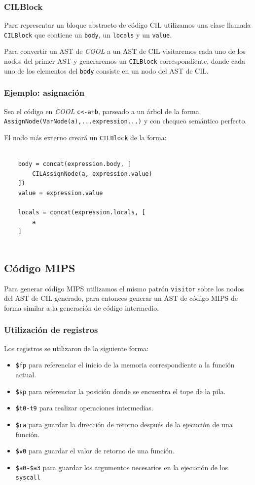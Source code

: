 \documentclass[a4paper,10pt,twocolumn]{article}
\begin{document}
\subsubsection{CILBlock}
Para representar un bloque abstracto de código CIL utilizamos una clase llamada \lstinline|CILBlock| que contiene un \lstinline|body|, un \lstinline|locals| y un \lstinline|value|. 

Para convertir un AST de \textit{COOL} a un AST de CIL visitaremos cada uno de los nodos del primer AST y generaremos un \lstinline|CILBlock| correspondiente, donde cada uno de los elementos del \lstinline|body| consiste en un nodo del AST de CIL.

\subsubsection{Ejemplo: asignación}
Sea el código en \textit{COOL} \lstinline|c<-a+b|, parseado a un árbol de la forma \lstinline|AssignNode(VarNode(a),...expression...)| y con chequeo semántico perfecto. 

El nodo más externo creará un \lstinline|CILBlock| de la forma:
	\begin{lstlisting}
	
	body = concat(expression.body, [ 
		CILAssignNode(a, expression.value)
	])
	value = expression.value
	
	locals = concat(expression.locals, [
		a
	]
	
	\end{lstlisting}

\subsection{Código MIPS}

Para generar código MIPS utilizamos el mismo patrón \lstinline|visitor| sobre los nodos del AST de CIL generado, para entonces generar un AST de código MIPS de forma similar a la generación de código intermedio. 

\subsubsection{Utilización de registros}
Los registros se utilizaron de la siguiente forma:
\begin{itemize}
	\item \lstinline|$fp| para referenciar el inicio de la memoria correspondiente a la función actual.
	\item \lstinline|$sp| para referenciar la posición donde se encuentra el tope de la pila. 
	\item \lstinline|$t0-t9| para realizar operaciones intermedias. 
	\item \lstinline|$ra| para guardar la dirección de retorno después de la ejecución de una función. 
	\item \lstinline|$v0| para guardar el valor de retorno de una función. 
	\item \lstinline|$a0-$a3| para guardar los argumentos necesarios en la ejecución de los \lstinline|syscall|
\end{itemize}
\end{document}
